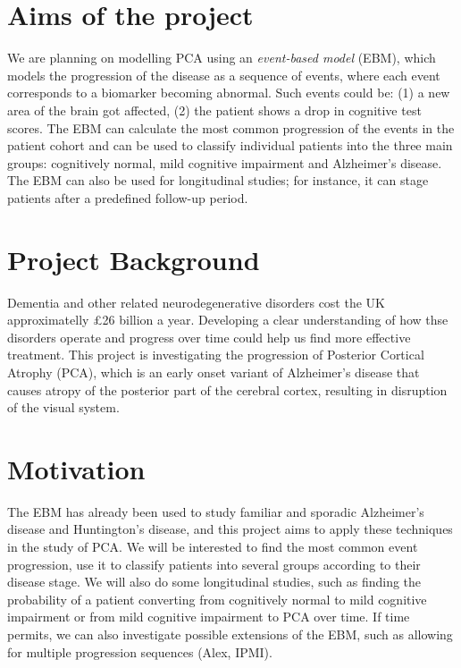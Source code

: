 \documentclass[12pt,a4paper,oneside]{report}
\begin{document}
\section*{Aims of the project}

We are planning on modelling PCA using an \textit{event-based model} (EBM), which models the progression of the disease as a sequence of events, where each event corresponds to a biomarker becoming abnormal. Such events could be: (1) a new area of the brain got affected, (2) the patient shows a drop in cognitive test scores. The EBM can calculate the most common progression of the events in the patient cohort and can be used to classify individual patients into the three main groups: cognitively normal, mild cognitive impairment and Alzheimer's disease. The EBM can also be used for longitudinal studies; for instance, it can stage patients after a predefined follow-up period.

\section*{Project Background}

Dementia and other related neurodegenerative disorders cost the UK approximatelly \pounds 26 billion a year. Developing a clear understanding of how thse disorders operate and progress over time could help us find more effective treatment. This project is investigating the progression of Posterior Cortical Atrophy (PCA), which is an early onset variant of Alzheimer's disease that  causes atropy of the posterior part of the cerebral cortex, resulting in disruption of the visual system. 

\section*{Motivation}

The EBM has already been used to study familiar and sporadic Alzheimer's disease and Huntington's disease, and this project aims to apply these techniques in the study of PCA. We will be interested to find the most common event progression, use it to classify patients into several groups according to their disease stage. We will also do some longitudinal studies, such as finding the probability of a patient converting from cognitively normal to mild cognitive impairment or from mild cognitive impairment to PCA over time. If time permits, we can also investigate possible extensions of the EBM, such as allowing for multiple progression sequences (Alex, IPMI).
\end{document}

